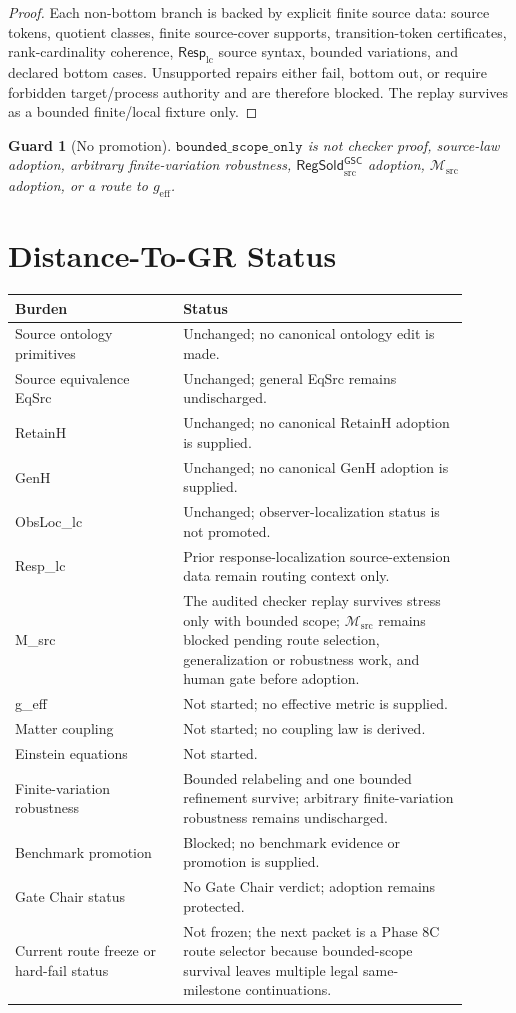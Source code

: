 \documentclass[11pt]{article}
\newcommand{\RespLC}{\mathsf{Resp}_{\mathrm{lc}}}
\newcommand{\Msrc}{\mathcal{M}_{\mathrm{src}}}
\newcommand{\geff}{g_{\mathrm{eff}}}
\newcommand{\RegSold}{\mathsf{RegSold}_{\mathrm{src}}^{\mathsf{GSC}}}
\newtheorem{guard}{Guard}
\begin{document}
\begin{proof}
Each non-bottom branch is backed by explicit finite source data: source tokens,
quotient classes, finite source-cover supports, transition-token certificates,
rank-cardinality coherence, \(\RespLC\) source syntax, bounded variations, and
declared bottom cases. Unsupported repairs either fail, bottom out, or require
forbidden target/process authority and are therefore blocked. The replay
survives as a bounded finite/local fixture only.
\end{proof}

\begin{guard}[No promotion]
\(\texttt{bounded\_scope\_only}\) is not checker proof, source-law adoption,
arbitrary finite-variation robustness, \(\RegSold\) adoption, \(\Msrc\)
adoption, or a route to \(\geff\).
\end{guard}

\section{Distance-To-GR Status}

\begin{center}
\begin{tabular}{p{0.33\linewidth}p{0.57\linewidth}}
\hline
Burden & Status \\
\hline
Source ontology primitives & Unchanged; no canonical ontology edit is made. \\
Source equivalence EqSrc & Unchanged; general EqSrc remains undischarged. \\
RetainH & Unchanged; no canonical RetainH adoption is supplied. \\
GenH & Unchanged; no canonical GenH adoption is supplied. \\
ObsLoc\_lc & Unchanged; observer-localization status is not promoted. \\
Resp\_lc & Prior response-localization source-extension data remain routing context only. \\
M\_src & The audited checker replay survives stress only with bounded scope; \(\Msrc\) remains blocked pending route selection, generalization or robustness work, and human gate before adoption. \\
g\_eff & Not started; no effective metric is supplied. \\
Matter coupling & Not started; no coupling law is derived. \\
Einstein equations & Not started. \\
Finite-variation robustness & Bounded relabeling and one bounded refinement survive; arbitrary finite-variation robustness remains undischarged. \\
Benchmark promotion & Blocked; no benchmark evidence or promotion is supplied. \\
Gate Chair status & No Gate Chair verdict; adoption remains protected. \\
Current route freeze or hard-fail status & Not frozen; the next packet is a Phase 8C route selector because bounded-scope survival leaves multiple legal same-milestone continuations. \\
\hline
\end{tabular}
\end{center}
\end{document}
